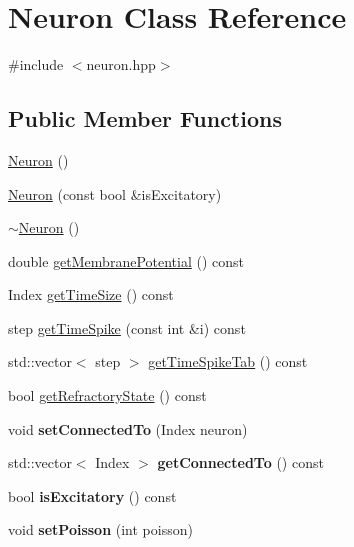 \hypertarget{classNeuron}{\section{Neuron Class Reference}
\label{classNeuron}
}


{\ttfamily \#include $<$neuron.\-hpp$>$}

\subsection*{Public Member Functions}
\begin{DoxyCompactItemize}
\item 
\hyperlink{classNeuron_a823487d01615fadb8ac19a2768dd9d96}{Neuron} ()
\item 
\hyperlink{classNeuron_a2e40248fde544ffd0b2d93131d2d11f2}{Neuron} (const bool \&is\-Excitatory)
\item 
\hyperlink{classNeuron_a94a250ce7e167760e593979b899745b1}{$\sim$\-Neuron} ()
\item 
double \hyperlink{classNeuron_a86341dee7a81765fe4840777a008c688}{get\-Membrane\-Potential} () const 
\item 
Index \hyperlink{classNeuron_a383eef0a6578f876e9df360f4683afd5}{get\-Time\-Size} () const 
\item 
step \hyperlink{classNeuron_a8d9daa0300ab78408e8b4c4d1b04705b}{get\-Time\-Spike} (const int \&i) const 
\item 
std\-::vector$<$ step $>$ \hyperlink{classNeuron_a35f338de50267c40039e1c38bc927a52}{get\-Time\-Spike\-Tab} () const 
\item 
bool \hyperlink{classNeuron_a598f5a1143fa5b83c9edf952d87d05c5}{get\-Refractory\-State} () const 
\item 
\hypertarget{classNeuron_a4b63e181e210c21a001033451a316b8c}{void {\bfseries set\-Connected\-To} (Index neuron)}\label{classNeuron_a4b63e181e210c21a001033451a316b8c}

\item 
\hypertarget{classNeuron_a8e0f567253334f3b63075f181b40f1d0}{std\-::vector$<$ Index $>$ {\bfseries get\-Connected\-To} () const }\label{classNeuron_a8e0f567253334f3b63075f181b40f1d0}

\item 
\hypertarget{classNeuron_a65f5868f9a2ddc2414a5880f28b76d4c}{bool {\bfseries is\-Excitatory} () const }\label{classNeuron_a65f5868f9a2ddc2414a5880f28b76d4c}

\item 
\hypertarget{classNeuron_aba53451b6350d647344e07967df65aeb}{void {\bfseries set\-Poisson} (int poisson)}\label{classNeuron_aba53451b6350d647344e07967df65aeb}


\end{DoxyCompactItemize}
